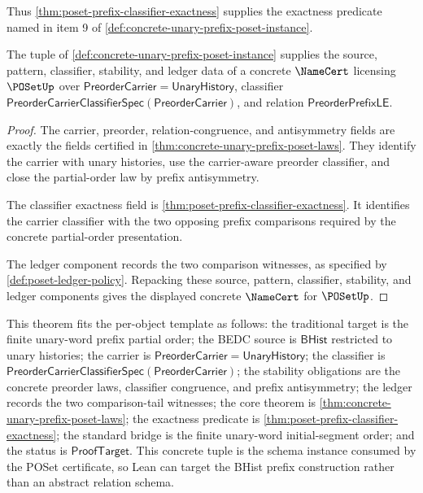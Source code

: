 Thus \autoref{thm:poset-prefix-classifier-exactness} supplies the exactness
predicate named in item 9 of
\autoref{def:concrete-unary-prefix-poset-instance}.

\begin{theorem}
\label{thm:concrete-unary-prefix-poset-namecert}
The tuple of \autoref{def:concrete-unary-prefix-poset-instance} supplies the
source, pattern, classifier, stability, and ledger data of a concrete
$\NameCert$ licensing $\POSetUp$ over
$\mathsf{PreorderCarrier}=\mathsf{UnaryHistory}$, classifier
$\mathsf{PreorderCarrierClassifierSpec}(\mathsf{PreorderCarrier})$, and
relation $\mathsf{PreorderPrefixLE}$.
\end{theorem}
\begin{proof}
The carrier, preorder, relation-congruence, and antisymmetry fields are exactly
the fields certified in \autoref{thm:concrete-unary-prefix-poset-laws}. They
identify the carrier with unary histories, use the carrier-aware preorder
classifier, and close the partial-order law by prefix antisymmetry.

The classifier exactness field is
\autoref{thm:poset-prefix-classifier-exactness}. It identifies the carrier
classifier with the two opposing prefix comparisons required by the concrete
partial-order presentation.

The ledger component records the two comparison witnesses, as specified by
\autoref{def:poset-ledger-policy}. Repacking these source, pattern,
classifier, stability, and ledger components gives the displayed concrete
$\NameCert$ for $\POSetUp$.
\end{proof}

This theorem fits the per-object template as follows: the traditional target is
the finite unary-word prefix partial order; the BEDC source is $\mathsf{BHist}$
restricted to unary histories; the carrier is
$\mathsf{PreorderCarrier}=\mathsf{UnaryHistory}$; the classifier is
$\mathsf{PreorderCarrierClassifierSpec}(\mathsf{PreorderCarrier})$; the
stability obligations are the concrete preorder laws, classifier congruence,
and prefix antisymmetry; the ledger records the two comparison-tail witnesses;
the core theorem is \autoref{thm:concrete-unary-prefix-poset-laws}; the
exactness predicate is \autoref{thm:poset-prefix-classifier-exactness}; the
standard bridge is the finite unary-word initial-segment order; and the status
is $\mathsf{ProofTarget}$. This concrete tuple is the schema instance consumed
by the POSet certificate, so Lean can target the BHist prefix construction
rather than an abstract relation schema.

